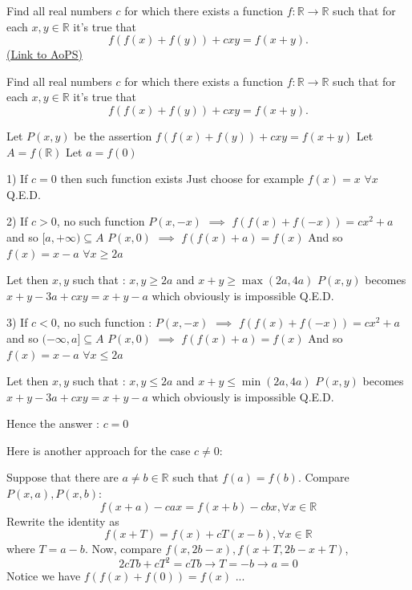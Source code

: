 \begin{problem}
	Find all real numbers $c$ for which there exists a function $f:\mathbb R\rightarrow \mathbb R$ such that for each $x, y\in\mathbb R$ it's true that
$$f(f(x)+f(y))+cxy=f(x+y).$$
	\flushright \href{https://artofproblemsolving.com/community/c6h1629425}{(Link to AoPS)}
\end{problem}



\begin{solution}
	\begin{tcolorbox}Find all real numbers $c$ for which there exists a function $f:\mathbb R\rightarrow \mathbb R$ such that for each $x, y\in\mathbb R$ it's true that
$$f(f(x)+f(y))+cxy=f(x+y).$$\end{tcolorbox}
Let $P(x,y)$ be the assertion $f(f(x)+f(y))+cxy=f(x+y)$
Let $A=f(\mathbb R)$
Let $a=f(0)$

1) If $c=0$ then such function exists
Just choose for example $f(x)=x$ $\forall x$
Q.E.D.

2) If $c>0$, no such function
$P(x,-x)$ $\implies$ $f(f(x)+f(-x))=cx^2+a$ and so $[a,+\infty)\subseteq A$
$P(x,0)$ $\implies$ $f(f(x)+a)=f(x)$
And so $f(x)=x-a$ $\forall x\ge 2a$

Let then $x,y$ such that : $x,y\ge 2a$ and $x+y\ge\max(2a,4a)$
$P(x,y)$ becomes $x+y-3a+cxy=x+y-a$ which obviously is impossible
Q.E.D.

3) If $c<0$, no such function :
$P(x,-x)$ $\implies$ $f(f(x)+f(-x))=cx^2+a$ and so $(-\infty,a]\subseteq A$
$P(x,0)$ $\implies$ $f(f(x)+a)=f(x)$
And so $f(x)=x-a$ $\forall x\le 2a$

Let then $x,y$ such that : $x,y\le 2a$ and $x+y\le\min(2a,4a)$
$P(x,y)$ becomes $x+y-3a+cxy=x+y-a$ which obviously is impossible
Q.E.D.

Hence the answer : $\boxed{c=0}$


\end{solution}



\begin{solution}
	Here is another approach for the case $ c \neq 0 $:

Suppose that there are $ a \neq b \in \mathbb{R} $ such that $ f\left(a\right) = f\left(b\right) $.  Compare $ P\left(x,a\right), P\left(x,b\right) $: $$ f\left(x+a\right)-cax = f\left(x+b\right)-cbx , \forall x \in \mathbb{R} $$ Rewrite the identity as $$ f\left(x+T\right) = f\left(x\right)+cT\left(x-b\right), \forall x \in \mathbb{R} $$ where $ T = a-b $. Now, compare $ f\left(x,2b-x\right), f\left(x+T,2b-x+T\right) $, $$ 2cTb+cT^2 = cTb \rightarrow T = -b \rightarrow a =0 $$ Notice we have $ f\left(f\left(x\right)+f\left(0\right)\right) = f\left(x\right) $ ...
\end{solution}



